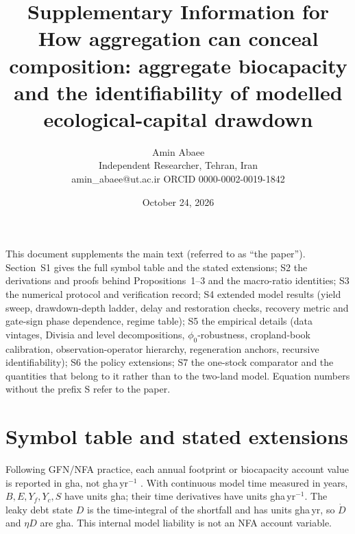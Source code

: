 \documentclass[11pt,a4paper]{article}
\title{Supplementary Information for\\[4pt]
\large How aggregation can conceal composition: aggregate biocapacity and the identifiability of modelled ecological-capital drawdown}
\author{Amin Abaee\\ \small Independent Researcher, Tehran, Iran\\ \small amin\_abaee@ut.ac.ir \quad ORCID 0000-0002-0019-1842}
\date{October 24, 2026}
\begin{document}
\maketitle

\noindent This document supplements the main text (referred to as ``the paper''). Section~S1 gives the full symbol table and the stated extensions; S2 the derivations and proofs behind Propositions~1--3 and the macro-ratio identities; S3 the numerical protocol and verification record; S4 extended model results (yield sweep, drawdown-depth ladder, delay and restoration checks, recovery metric and gate-sign phase dependence, regime table); S5 the empirical details (data vintages, Divisia and level decompositions, $\phi_0$-robustness, cropland-book calibration, observation-operator hierarchy, regeneration anchors, recursive identifiability); S6 the policy extensions; S7 the one-stock comparator and the quantities that belong to it rather than to the two-land model. Equation numbers without the prefix S refer to the paper.

\tableofcontents

\section{Symbol table and stated extensions}\label{si:symbols}

Following GFN/NFA practice, each annual footprint or biocapacity account value is reported in gha, not gha\,yr$^{-1}$ \citep{GFNStandards2009,GFNGuidebook2019}. With continuous model time measured in years, $B,E,Y_f,Y_c,S$ have units gha; their time derivatives have units gha\,yr$^{-1}$. The leaky debt state $D$ is the time-integral of the shortfall and has units gha\,yr, so $\dot D$ and $\eta D$ are gha. This internal model liability is not an NFA account variable.
\end{document}
